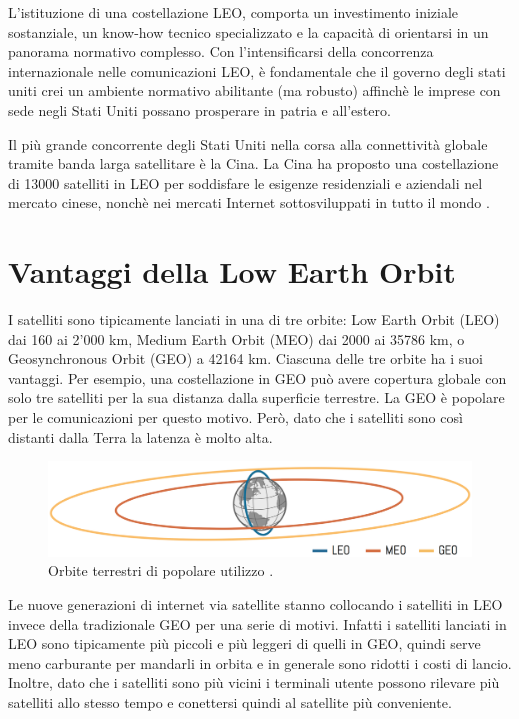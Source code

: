 L'istituzione di una costellazione \ac{LEO}, comporta un investimento iniziale sostanziale, un know-how tecnico specializzato e la capacità di orientarsi in un panorama normativo complesso.
Con l'intensificarsi della concorrenza internazionale nelle comunicazioni \ac{LEO}, è fondamentale che il governo degli stati uniti crei un ambiente normativo abilitante (ma robusto) affinchè le imprese con sede negli Stati Uniti possano prosperare in patria e all'estero.

Il più grande concorrente degli Stati Uniti nella corsa alla connettività globale tramite banda larga satellitare è la Cina.
La Cina ha proposto una costellazione di 13000 satelliti in \ac{LEO} per soddisfare le esigenze residenziali e aziendali nel mercato cinese, nonchè nei mercati Internet sottosviluppati in tutto il mondo \cite{makena_young_low_2022}.

\section{Vantaggi della Low Earth Orbit}

I satelliti sono tipicamente lanciati in una di tre orbite: Low Earth Orbit (\ac{LEO}) dai 160 ai 2'000 km, Medium Earth Orbit (\ac{MEO}) dai 2000 ai 35786 km, o Geosynchronous Orbit (GEO) a 42164 km.
Ciascuna delle tre orbite ha i suoi vantaggi.
Per esempio, una costellazione in GEO può avere copertura globale con solo tre satelliti per la sua distanza dalla superficie terrestre.
La GEO è popolare per le comunicazioni per questo motivo.
Però, dato che i satelliti sono così distanti dalla Terra la latenza è molto alta.

\begin{figure}[htbp]
  \centering
  \includegraphics[width=0.9\linewidth]{./res/img/leo_orbit.png}
  \caption{Orbite terrestri di popolare utilizzo \cite{thomas_g_roberts_popular_2022}.}
  \label{fig:leo-orbit}
\end{figure}

Le nuove generazioni di internet via satellite stanno collocando i satelliti in \ac{LEO} invece della tradizionale \ac{GEO} per una serie di motivi.
Infatti i satelliti lanciati in \ac{LEO} sono tipicamente più piccoli e più leggeri di quelli in \ac{GEO}, quindi serve meno carburante per mandarli in orbita e in generale sono ridotti i costi di lancio.
Inoltre, dato che i satelliti sono più vicini i terminali utente possono rilevare più satelliti allo stesso tempo e conettersi quindi al satellite più conveniente.

